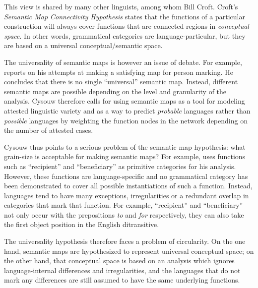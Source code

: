 This view is shared by many other linguists, among whom Bill Croft. Croft's {\em Semantic Map Connectivity Hypothesis} \citep[96]{croft01radical} states that the functions of a particular construction will always cover functions that are connected regions in {\em conceptual space}. In other words, grammatical categories are language-particular, but they are based on a universal conceptual/semantic space.

The universality of semantic maps is however an issue of debate. For example, \citet{cysouw08building} reports on his attempts at making a satisfying map for person marking. He concludes that there is no single ``universal'' semantic map. Instead, different semantic maps are possible depending on the level and granularity of the analysis. Cysouw therefore calls for using semantic maps as a tool for modeling attested linguistic variety and as a way to predict {\em probable} languages rather than {\em possible} languages by weighting the function nodes in the network depending on the number of attested cases.

Cysouw thus points to a serious problem of the semantic map hypothesis: what grain-size is acceptable for making semantic maps? For example, \citet{haspelmath03geometry} uses functions such as ``recipient'' and ``beneficiary'' as primitive categories for his analysis. However, these functions are language-specific and no grammatical category has been demonstrated to cover all possible instantiations of such a function. Instead, languages tend to have many exceptions, irregularities or a redundant overlap in categories that mark that function. For example, ``recipient'' and ``beneficiary'' not only occur with the prepositions {\em to} and {\em for} respectively, they can also take the first object position in the English ditransitive.

The universality hypothesis therefore faces a problem of circularity. On the one hand, semantic maps are hypothesized to represent universal conceptual space; on the other hand, that conceptual space is based on an analysis which ignores language-internal differences and irregularities, and the languages that do not mark any differences are still assumed to have the same underlying functions.

